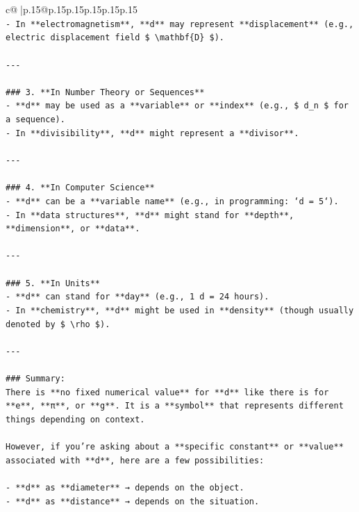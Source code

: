 \documentclass{article}
\begin{document}
{\begin{supertabular}{c@{$\;$}|p{.15\linewidth}@{}p{.15\linewidth}p{.15\linewidth}p{.15\linewidth}p{.15\linewidth}p{.15\linewidth}}
{{{\\ 
\texttt{{-} In **electromagnetism**, **d** may represent **displacement** (e.g., electric displacement field \$ \textbackslash{}mathbf\{D\} \$).} \\
\\ 
\texttt{{-}{-}{-}} \\
\\ 
\texttt{\#\#\# 3. **In Number Theory or Sequences**} \\
\texttt{{-} **d** may be used as a **variable** or **index** (e.g., \$ d\_n \$ for a sequence).} \\
\texttt{{-} In **divisibility**, **d** might represent a **divisor**.} \\
\\ 
\texttt{{-}{-}{-}} \\
\\ 
\texttt{\#\#\# 4. **In Computer Science**} \\
\texttt{{-} **d** can be a **variable name** (e.g., in programming: `d = 5`).} \\
\texttt{{-} In **data structures**, **d** might stand for **depth**, **dimension**, or **data**.} \\
\\ 
\texttt{{-}{-}{-}} \\
\\ 
\texttt{\#\#\# 5. **In Units**} \\
\texttt{{-} **d** can stand for **day** (e.g., 1 d = 24 hours).} \\
\texttt{{-} In **chemistry**, **d** might be used in **density** (though usually denoted by \$ \textbackslash{}rho \$).} \\
\\ 
\texttt{{-}{-}{-}} \\
\\ 
\texttt{\#\#\# Summary:} \\
\texttt{There is **no fixed numerical value** for **d** like there is for **e**, **π**, or **g**. It is a **symbol** that represents different things depending on context.} \\
\\ 
\texttt{However, if you're asking about a **specific constant** or **value** associated with **d**, here are a few possibilities:} \\
\\ 
\texttt{{-} **d** as **diameter** → depends on the object.} \\
\texttt{{-} **d** as **distance** → depends on the situation.} \\
}}}
\end{supertabular}}
\end{document}
